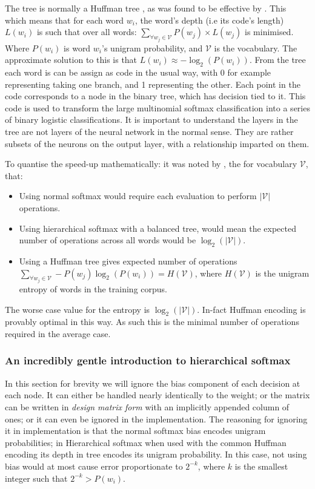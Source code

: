 \documentclass[parskip]{komatufte}
\begin{document}
The tree is normally a Huffman tree , as was found to be effective by .
This which means that for each word $w_i$, the word's depth (i.e its code's length) $L(w_i)$ is such that over all words: $\sum_{\forall w_j \in \mathcal{V}} P(w_j)\times L(w_j)$ is minimised.
Where $P(w_i)$ is word $w_i$'s unigram probability, and $\mathcal{V}$ is the vocabulary.
The approximate solution to this is that $L(w_i) \approx -\log_2(P(w_i))$.
From the tree each word is can be assign as code in the usual way, with 0 for example representing taking one branch, and 1 representing the other.
Each point in the code corresponds to a node in the binary tree, which has decision tied to it.
This code is used to transform the large  multinomial softmax classification into a series of binary logistic classifications.
It is important to understand the layers in the tree are not layers of the neural network in the normal sense.
They are rather subsets of the neurons on the output layer, with a relationship imparted on them.

To quantise the speed-up mathematically:
it was noted by , the for vocabulary $\mathcal{V}$, that:
\begin{itemize}
	\item Using normal softmax would require each evaluation to perform $|\mathcal{V}|$ operations.
	\item Using hierarchical softmax with a balanced tree, would mean the expected number of operations across all words would be $\log_2(|\mathcal{V}|)$.
	\item Using a Huffman tree gives expected number of operations $\sum_{\forall w_j \in \mathcal{V}} -P(w_j)\log_2(P(w_i)) = H(\mathcal{V})$, where $H(\mathcal{V})$ is the unigram entropy of words in the training corpus.
\end{itemize}
The worse case value for the entropy is $\log_2(|\mathcal{V}|)$.
In-fact Huffman encoding is provably optimal in this way.
As such this is the minimal number of operations required in the average case.


\subsubsection{An incredibly gentle introduction to hierarchical softmax}

In this section for brevity we will ignore the bias component of each decision at each node.
It can either be handled nearly identically to the weight;
or the matrix can be written in \emph{design matrix form} with an implicitly appended column of ones;
or it can even be ignored in the implementation.
The reasoning for ignoring it in implementation is that the normal softmax bias encodes unigram probabilities;
in Hierarchical softmax when used with the common Huffman encoding its depth in tree encodes its unigram probability. In this case, not using bias would at most cause error proportionate to $2^{-k}$, where $k$ is the smallest integer such that $2^{-k}>P(w_i)$.
\end{document}

